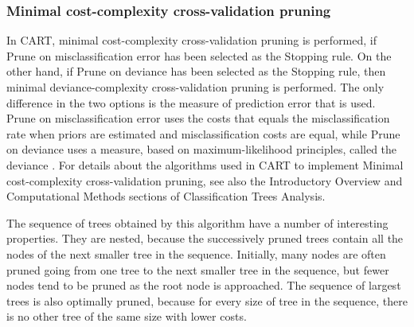 \subsubsection{Minimal cost-complexity cross-validation pruning} 
In CART, minimal cost-complexity cross-validation pruning is performed, if Prune on misclassification error has been selected as the Stopping rule. On the other hand, if Prune on deviance has been selected as the Stopping rule, then minimal deviance-complexity cross-validation pruning is performed. The only difference in the two options is the measure of prediction error that is used. Prune on misclassification error uses the costs that equals the misclassification rate when priors are estimated and misclassification costs are equal, while Prune on deviance uses a measure, based on maximum-likelihood principles, called the deviance .
For details about the algorithms used in CART to implement Minimal cost-complexity cross-validation pruning, see also the Introductory Overview and Computational Methods sections of Classification Trees Analysis.

The sequence of trees obtained by this algorithm have a number of interesting properties. They are nested, because the successively pruned trees contain all the nodes of the next smaller tree in the sequence. Initially, many nodes are often pruned going from one tree to the next smaller tree in the sequence, but fewer nodes tend to be pruned as the root node is approached. The sequence of largest trees is also optimally pruned, because for every size of tree in the sequence, there is no other tree of the same size with lower costs. 

